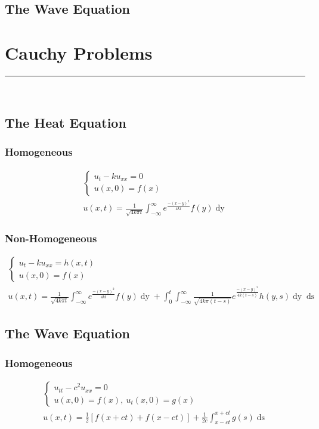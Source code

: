 \documentclass{article}
\begin{document}
\subsection{The Wave Equation}



\newpage
\section{Cauchy Problems}
\hrule
\noindent\\
\subsection{The Heat Equation}
\subsubsection*{Homogeneous}
\begin{gather*}
\begin{cases}
u_{t} - k u_{xx} = 0\\
u(x,0) = f(x)
\end{cases}\\
u(x,t) = \frac{1}{\sqrt{4k\pi t}}\int_{-\infty}^{\infty}e^{\frac{-(x-y)^{2}}{4kt}}f(y)\mathop{dy}
\end{gather*}
\subsubsection*{Non-Homogeneous}
\begin{gather*}
\begin{cases}
u_{t} - k u_{xx} = h(x,t)\\
u(x,0) = f(x)
\end{cases}\\
u(x,t) = \frac{1}{\sqrt{4k\pi t}}\int_{-\infty}^{\infty}e^{\frac{-(x-y)^{2}}{4kt}}f(y)\mathop{dy} + \int_{0}^{t}\int_{-\infty}^{\infty}\frac{1}{\sqrt{4k\pi(t-s)}}e^{\frac{-(x-y)^{2}}{4k(t -s)}}h(y,s)\mathop{dy}\mathop{ds}
\end{gather*}
\subsection{The Wave Equation}
\subsubsection*{Homogeneous}
\begin{gather*}
\begin{cases}
u_{tt} - c^{2}u_{xx} = 0\\
u(x,0) = f(x),\ u_{t}(x,0) = g(x)
\end{cases}\\
u(x,t) = \frac{1}{2}\left[f(x+ct) + f(x-ct)\right] + \frac{1}{2c}\int_{x-ct}^{x+ct}g(s)\mathop{ds}
\end{gather*}
\end{document}
